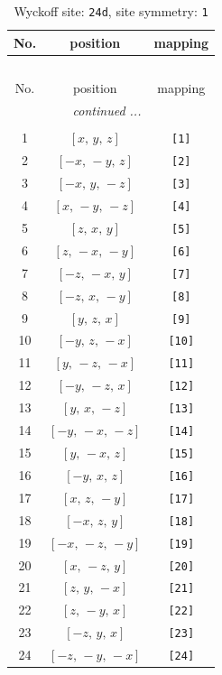 \documentclass[fleqn,8pt]{jsarticle}
\begin{document}
\begin{longtable}{ccc}
\caption{Wyckoff site: {\tt 24d}, site symmetry: {\tt 1}}
 \\
 \hline \hline
No. & position & mapping \\ \hline \endfirsthead

\multicolumn{2}{l}{\tablename\ \thetable{}} \\
 \hline \hline
No. & position & mapping \\ \hline \endhead

 \hline \hline
\multicolumn{2}{r}{\footnotesize\it continued ...} \\ \endfoot

 \hline \hline
\multicolumn{2}{r}{} \\ \endlastfoot

1 & $\left[ x,\, y,\, z \right]$ & {\tt [1]} \\ \hline
2 & $\left[ - x,\, - y,\, z \right]$ & {\tt [2]} \\ \hline
3 & $\left[ - x,\, y,\, - z \right]$ & {\tt [3]} \\ \hline
4 & $\left[ x,\, - y,\, - z \right]$ & {\tt [4]} \\ \hline
5 & $\left[ z,\, x,\, y \right]$ & {\tt [5]} \\ \hline
6 & $\left[ z,\, - x,\, - y \right]$ & {\tt [6]} \\ \hline
7 & $\left[ - z,\, - x,\, y \right]$ & {\tt [7]} \\ \hline
8 & $\left[ - z,\, x,\, - y \right]$ & {\tt [8]} \\ \hline
9 & $\left[ y,\, z,\, x \right]$ & {\tt [9]} \\ \hline
10 & $\left[ - y,\, z,\, - x \right]$ & {\tt [10]} \\ \hline
11 & $\left[ y,\, - z,\, - x \right]$ & {\tt [11]} \\ \hline
12 & $\left[ - y,\, - z,\, x \right]$ & {\tt [12]} \\ \hline
13 & $\left[ y,\, x,\, - z \right]$ & {\tt [13]} \\ \hline
14 & $\left[ - y,\, - x,\, - z \right]$ & {\tt [14]} \\ \hline
15 & $\left[ y,\, - x,\, z \right]$ & {\tt [15]} \\ \hline
16 & $\left[ - y,\, x,\, z \right]$ & {\tt [16]} \\ \hline
17 & $\left[ x,\, z,\, - y \right]$ & {\tt [17]} \\ \hline
18 & $\left[ - x,\, z,\, y \right]$ & {\tt [18]} \\ \hline
19 & $\left[ - x,\, - z,\, - y \right]$ & {\tt [19]} \\ \hline
20 & $\left[ x,\, - z,\, y \right]$ & {\tt [20]} \\ \hline
21 & $\left[ z,\, y,\, - x \right]$ & {\tt [21]} \\ \hline
22 & $\left[ z,\, - y,\, x \right]$ & {\tt [22]} \\ \hline
23 & $\left[ - z,\, y,\, x \right]$ & {\tt [23]} \\ \hline
24 & $\left[ - z,\, - y,\, - x \right]$ & {\tt [24]} \\
\end{longtable}
\end{document}
